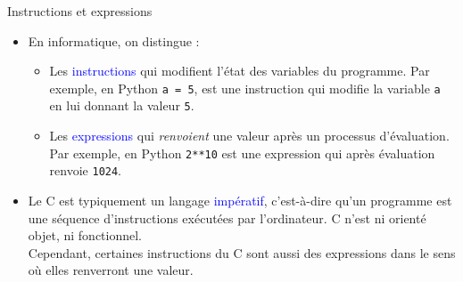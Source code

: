 \documentclass[10pt]{beamer}
\begin{document}
\begin{frame}{\Ctitle}{\stitle}
	\begin{block}{Instructions et expressions}
		\begin{itemize}
			\item<1-> En informatique, on distingue :
			\begin{itemize}
			\item <1-> Les \textcolor{blue}{instructions} qui modifient l'état des variables du programme. Par exemple, en Python \texttt{a = 5}, est une instruction qui modifie la variable {\tt a} en lui donnant la valeur {\tt 5}.
			\item <1-> Les \textcolor{blue}{expressions} qui \textit{renvoient} une valeur après un processus d'évaluation. Par exemple, en Python \texttt{2**10} est une expression qui après évaluation renvoie {\tt 1024}.
			\end{itemize}
			\item <2-> Le C est typiquement un langage \textcolor{blue}{impératif}, c'est-à-dire qu'un programme est une séquence d'instructions exécutées par l'ordinateur. C n'est ni orienté objet, ni fonctionnel. \\
			\textcolor{BrickRed}{\small \danger \;} Cependant, certaines instructions du C sont aussi des expressions dans le sens où elles renverront une valeur.
		\end{itemize}
	\end{block}
\end{frame}
\end{document}
